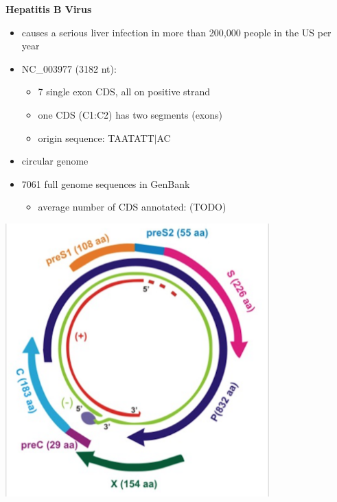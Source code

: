 \documentclass[landscape]{slides}
\begin{document}
\begin{slide}
\begin{center}
\textbf{Hepatitis B Virus}

\begin{minipage}[c]{6in}
\tiny
\begin{itemize}
\item causes a serious liver infection in more than 200,000 people in
  the US per year
\item NC\_003977 (3182 nt):
  \begin{itemize}
    \item 7 single exon CDS, all on positive strand
    \item one CDS (C1:C2) has two segments (exons)
    \item origin sequence: TAATATT$|$AC
  \end{itemize}
\item circular genome
\item 7061 full genome sequences in GenBank
\begin{itemize}
  \item average number of CDS annotated: (TODO)
\end{itemize}
\end{itemize}
\vspace{3in}
\end{minipage}
\begin{minipage}[c]{4in}
\includegraphics[width=4in]{figs/hbv-genome-small-lowres}
\vspace{3in}
\end{minipage}

\vfill
\end{center}
\end{slide}
\end{document}
